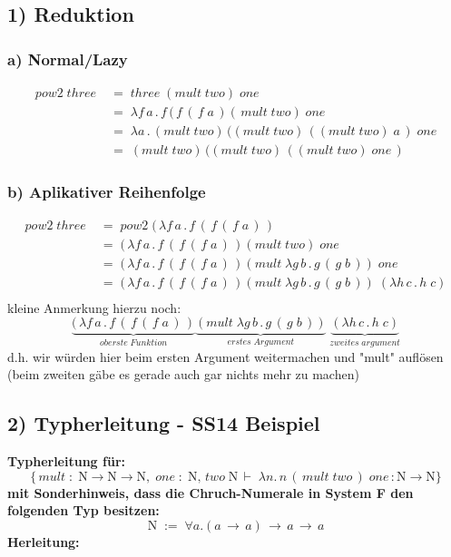 \documentclass{article}
\begin{document}
	\subsection*{1) Reduktion}
	\subsubsection*{a) Normal/Lazy}
		\begin{align*}
			 pow2\;three\;	&=\;	three\;(mult\;two)\;one\\
			 				&=\;	\lambda f\,a\, .\,f\,(\,f\,(\,f\;a\,)(\,mult\;two)\;one\\
			 				&=\;	\lambda a\, .\, (mult\;two)\,((mult\;two)\,((mult\;two)\;a\,)\;one\\
			 				&=\;	(mult\;two)\,((mult\;two)\,((mult\;two)\;one\,)
		\end{align*}
	\subsubsection*{b) Aplikativer Reihenfolge}
		\begin{align*}
			pow2\;three\;	&=\;	pow2\; (\, \lambda f\,a\, .\,f\,(\,f\,(\,f\;a\,) \,)\\
							&=\;	(\, \lambda f\,a\, .\,f\,(\,f\,(\,f\;a\,) \,)(mult\;two)\;one\\
							&=\;	(\, \lambda f\,a\, .\,f\,(\,f\,(\,f\;a\,) \,)(mult\;\lambda g\,b\, .\,g\,(\,g\;b\,))\;one\\
							&=\;	(\, \lambda f\,a\, .\,f\,(\,f\,(\,f\;a\,) \,)(mult\;\lambda g\,b\, .\,g\,(\,g\;b\,))\;(\lambda h\,c\, .\,h\;c)\\
		\end{align*}
	kleine Anmerkung hierzu noch:
	\[
		\underbrace{(\, \lambda f\,a\, .\,f\,(\,f\,(\,f\;a\,) \,)}_{oberste\;Funktion}
		\underbrace{(mult\;\lambda g\,b\, .\,g\,(\,g\;b\,))}_{erstes\;Argument}
		\;
		\underbrace{(\lambda h\,c\, .\,h\;c)}_{zweites\;argument}
	\]
	d.h. wir w\"urden hier beim ersten Argument weitermachen und "mult" aufl\"osen
	(beim zweiten g\"abe es gerade auch gar nichts mehr zu machen)

	\subsection*{2) Typherleitung - SS14 Beispiel}	
		\textbf{Typherleitung f\"ur:}
		\[
			\{
			\,mult\;:\;
			\mathrm{N}\rightarrow\mathrm{N}\rightarrow\mathrm{N},\;
			one\; : \; \mathrm{N},\,two\;\mathrm{N}\,
			\vdash \; \lambda n.\,n\,(\, mult \; two\,)\;one\,:\mathrm{N}\rightarrow
			\mathrm{N}
			\}
		\]
		\textbf{mit Sonderhinweis, dass die Chruch-Numerale in System F den folgenden Typ besitzen:}
		\[
			\mathrm{N}\; := \; \forall a.(a\,\rightarrow \, a)\, \rightarrow \, a \, \rightarrow \,a		
		\]
	\textbf{Herleitung:}\\
		
\end{document}
